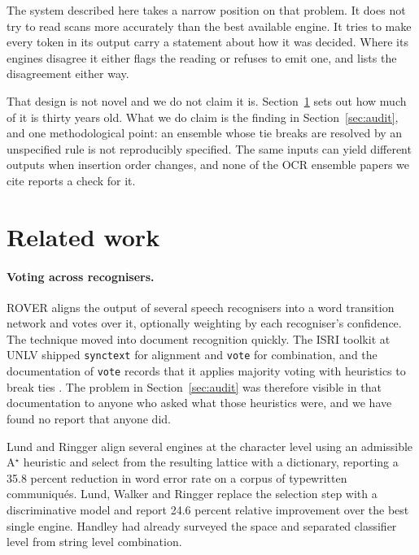 \documentclass[11pt,a4paper]{article}
\begin{document}
The system described here takes a narrow position on that problem. It does not try to
read scans more accurately than the best available engine. It tries to make every token in
its output carry a statement about how it was decided. Where its engines disagree it either
flags the reading or refuses to emit one, and lists the disagreement either way.

That design is not novel and we do not claim it is. Section~\ref{sec:related} sets out
how much of it is thirty years old. What we do claim is the finding in
Section~\ref{sec:audit}, and one methodological point: an ensemble whose tie breaks are
resolved by an unspecified rule is not reproducibly specified. The same inputs can yield
different outputs when insertion order changes, and none of the OCR ensemble papers we cite
reports a check for it.

\section{Related work}
\label{sec:related}

\paragraph{Voting across recognisers.} ROVER \cite{fiscus1997} aligns the output of
several speech recognisers into a word transition network and votes over it, optionally
weighting by each recogniser's confidence. The technique moved into document recognition
quickly. The ISRI toolkit at UNLV \cite{rice1994,nartker2005} shipped \texttt{synctext}
for alignment and \texttt{vote} for combination, and the documentation of \texttt{vote}
records that it applies majority voting with heuristics to break ties \cite{nartker2005}.
The problem in Section~\ref{sec:audit} was therefore visible in that documentation to
anyone who asked what those heuristics were, and we have found no report that anyone did.

Lund and Ringger \cite{lund2009} align several engines at the character level using an
admissible A$^{\star}$ heuristic and select from the resulting lattice with a dictionary,
reporting a 35.8 percent reduction in word error rate on a corpus of typewritten
communiqu\'es. Lund, Walker and Ringger \cite{lund2011} replace the selection step with a
discriminative model and report 24.6 percent relative improvement over the best single
engine. Handley \cite{handley1998} had already surveyed the space and separated
classifier level from string level combination.
\end{document}
